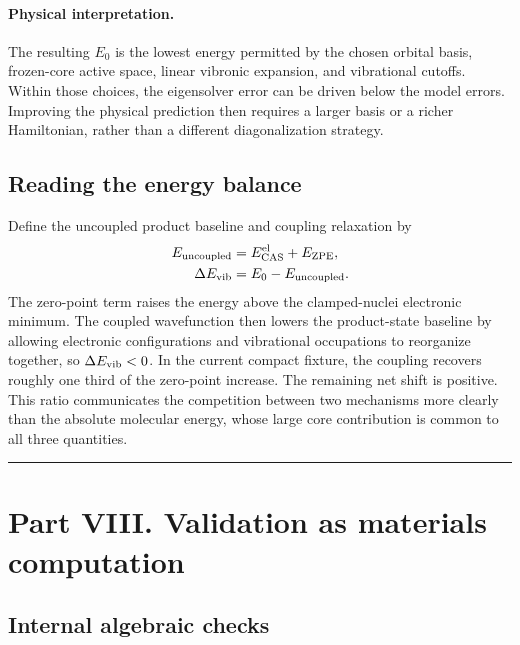 \documentclass[10pt,twocolumn]{article}
\newcommand{\conceptbreak}{%
  \par\medskip\noindent
  {\color{black!30}\rule{\columnwidth}{0.35pt}}%
  \par\medskip}
\newcommand{\physical}{\paragraph{Physical interpretation.}}
\begin{document}
\physical The resulting $E_0$ is the lowest energy permitted by the chosen
orbital basis, frozen-core active space, linear vibronic expansion, and
vibrational cutoffs.  Within those choices, the eigensolver error can be driven
below the model errors.  Improving the physical prediction then requires a
larger basis or a richer Hamiltonian, rather than a different diagonalization
strategy.

\subsection*{Reading the energy balance}

Define the uncoupled product baseline and coupling relaxation by
\begin{align}
E_{\rm uncoupled}&=E_{\rm CAS}^{\rm el}+E_{\rm ZPE},\nonumber\\
\Delta E_{\rm vib}&=E_0-E_{\rm uncoupled}.
\label{eq:energy-balance}
\end{align}
The zero-point term raises the energy above the clamped-nuclei electronic
minimum.  The coupled wavefunction then lowers the product-state baseline by
allowing electronic configurations and vibrational occupations to reorganize
together, so $\Delta E_{\rm vib}<0$.  In the current compact fixture, the
coupling recovers roughly one third of the zero-point increase.  The remaining
net shift is positive.  This ratio communicates the competition between two
mechanisms more clearly than the absolute molecular energy, whose large core
contribution is common to all three quantities.

\conceptbreak

\section*{Part VIII. Validation as materials computation}

\subsection*{Internal algebraic checks}
\end{document}
